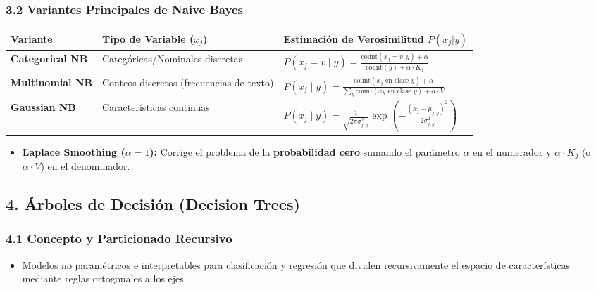 \subsubsection{3.2 Variantes Principales de Naive Bayes}

\begin{table}[htbp]
	\centering
	\small
	\begin{tabular}{|p{3cm}|p{3.5cm}|p{5.5cm}|}
		\hline
		\textbf{Variante} & \textbf{Tipo de Variable ($x_j$)} & \textbf{Estimación de Verosimilitud $P(x_j|y)$} \\ \hline
		\textbf{Categorical NB} & Categóricas/Nominales discretas & $P(x_j = v \mid y) = \frac{\text{count}(x_j=v, y) + \alpha}{\text{count}(y) + \alpha \cdot K_j}$ \\ \hline
		\textbf{Multinomial NB} & Conteos discretos (frecuencias de texto) & $P(x_j \mid y) = \frac{\text{count}(x_j \text{ en clase } y) + \alpha}{\sum_{k} \text{count}(x_k \text{ en clase } y) + \alpha \cdot V}$ \\ \hline
		\textbf{Gaussian NB} & Características continuas & $P(x_j \mid y) = \frac{1}{\sqrt{2\pi \sigma_{j,y}^2}} \exp\left(-\frac{(x_j - \mu_{j,y})^2}{2\sigma_{j,y}^2}\right)$ \\ \hline
	\end{tabular}
\end{table}

\begin{itemize}
	\item \textbf{Laplace Smoothing ($\alpha=1$):} Corrige el problema de la \textbf{probabilidad cero} sumando el parámetro $\alpha$ en el numerador y $\alpha \cdot K_j$ (o $\alpha \cdot V$) en el denominador.
\end{itemize}

\subsection{4. Árboles de Decisión (Decision Trees)}

\subsubsection{4.1 Concepto y Particionado Recursivo}

\begin{itemize}
	\item Modelos no paramétricos e interpretables para clasificación y regresión que dividen recursivamente el espacio de características mediante reglas ortogonales a los ejes.
\end{itemize}

